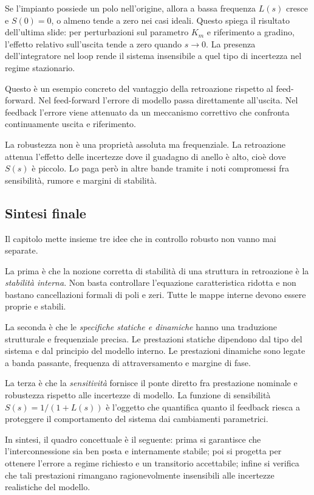 \documentclass[11pt,a4paper]{article}
\begin{document}
Se l'impianto possiede un polo nell'origine, allora a bassa frequenza $L(s)$ cresce e $S(0)=0$, o almeno tende a zero nei casi ideali. Questo spiega il risultato dell'ultima slide: per perturbazioni sul parametro $K_m$ e riferimento a gradino, l'effetto relativo sull'uscita tende a zero quando $s\to0$. La presenza dell'integratore nel loop rende il sistema insensibile a quel tipo di incertezza nel regime stazionario.

Questo è un esempio concreto del vantaggio della retroazione rispetto al feed-forward. Nel feed-forward l'errore di modello passa direttamente all'uscita. Nel feedback l'errore viene attenuato da un meccanismo correttivo che confronta continuamente uscita e riferimento.

\begin{keybox}
La robustezza non è una proprietà assoluta ma frequenziale. La retroazione attenua l'effetto delle incertezze dove il guadagno di anello è alto, cioè dove $S(s)$ è piccolo. Lo paga però in altre bande tramite i noti compromessi fra sensibilità, rumore e margini di stabilità.
\end{keybox}

\subsection{Sintesi finale}

Il capitolo mette insieme tre idee che in controllo robusto non vanno mai separate.

La prima è che la nozione corretta di stabilità di una struttura in retroazione è la \emph{stabilità interna}. Non basta controllare l'equazione caratteristica ridotta e non bastano cancellazioni formali di poli e zeri. Tutte le mappe interne devono essere proprie e stabili.

La seconda è che le \emph{specifiche statiche e dinamiche} hanno una traduzione strutturale e frequenziale precisa. Le prestazioni statiche dipendono dal tipo del sistema e dal principio del modello interno. Le prestazioni dinamiche sono legate a banda passante, frequenza di attraversamento e margine di fase.

La terza è che la \emph{sensitività} fornisce il ponte diretto fra prestazione nominale e robustezza rispetto alle incertezze di modello. La funzione di sensibilità $S(s)=1/(1+L(s))$ è l'oggetto che quantifica quanto il feedback riesca a proteggere il comportamento del sistema dai cambiamenti parametrici.

In sintesi, il quadro concettuale è il seguente: prima si garantisce che l'interconnessione sia ben posta e internamente stabile; poi si progetta per ottenere l'errore a regime richiesto e un transitorio accettabile; infine si verifica che tali prestazioni rimangano ragionevolmente insensibili alle incertezze realistiche del modello.
\end{document}
